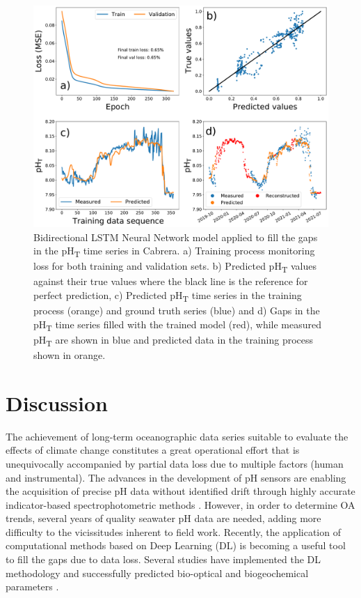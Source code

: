 \begin{figure}[H]
    \centering

    \includegraphics[width=\textwidth]{Figures/bidirectional_LSTM_gap_filling.pdf}
    \caption[Deep learning model applied to fill the
        gaps in the pH\textsubscript{T} time series in Cabrera]{Bidirectional
        LSTM Neural Network model applied to fill the gaps in the
        pH\textsubscript{T} time series in Cabrera. a) Training process
        monitoring loss for both training and validation sets. b) Predicted
        pH\textsubscript{T} values against their true values where the black
        line is the reference for perfect prediction, c) Predicted
        pH\textsubscript{T} time series in the training process (orange) and
        ground truth series (blue) and d) Gaps in the pH\textsubscript{T} time
        series filled with the trained model (red), while measured
        pH\textsubscript{T} are shown in blue and predicted data in the
        training process shown in orange.}
    \label{fig:Cabrera_gap_filling}
\end{figure}

\section{Discussion}
The achievement of long-term oceanographic data series suitable to evaluate
the effects of climate change constitutes a great operational effort that is
unequivocally accompanied by partial data loss due to multiple factors (human
and instrumental). The advances in the development of pH sensors are enabling
the acquisition of precise pH data without identified drift through highly
accurate indicator-based spectrophotometric methods \cite{seidel2008sensor}.
However, in order to determine OA trends, several years of quality seawater pH
data are needed, adding more difficulty to the vicissitudes inherent to field
work. Recently, the application of computational methods based on Deep Learning
(DL) is becoming a useful tool to fill the gaps due to data loss. Several
studies have implemented the DL methodology and successfully predicted
bio-optical and biogeochemical parameters
\cite{Bittig2018,Broullon2019,Broullon2021,Contractor2021,gregor2019comparative,lefevre2005comparison,Li2020nn,sauzede2017estimates,velo2013total}.

